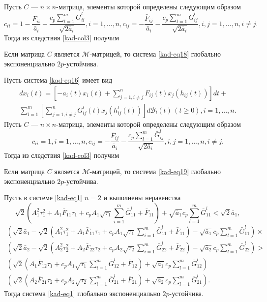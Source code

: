 Пусть $C$ --- $n\times n$-матрица, элементы которой определены
следующим образом
$$
c_{ii} = 1 - \frac{\bar F_{ii}}{\bar a_i} - \frac{c_p\sum \limits
_{l=1}^m \bar G^l_{ii}}{\sqrt{2\bar a_i}}, i = 1,...,n, c_{ij} = -
\frac{\bar F_{ij}}{\bar a_i} - \frac{c_p\sum \limits _{l=1}^m \bar
G^l_{ij}}{\sqrt{2\bar a_i}}, i,j = 1,...,n, i\neq j.
$$
Тогда из следствия \ref{kad-col3} получим
\begin{corollary}\label{kad-col5}
Если матрица $C$ является $\mathcal{M}$-матрицей, то система \eqref{kad-eq18} глобально экспоненциально $2p$-устойчива.
\end{corollary}
Пусть система \eqref{kad-eq16}  имеет вид
\begin{equation}\label{kad-eq19}
\begin{array}{crl}
dx_i(t) = \left [-a_i(t)x_i(t)+ \sum
\limits_{j=1, i\neq j}^nF_{ij}(t)x_j(h_{ij}(t))\right]dt +\\
 \sum \limits_{l=1}^m \left [\sum
\limits_{j=1, i \neq j}^nG^l_{ij}(t)x_j(h^l_{ij}(t))\right
]d\mathcal B_l(t) \, (t \ge 0), i = 1,...,n.
\end{array}
\end{equation}
Пусть $C$ --- $n\times n$-матрица, элементы которой определены
следующим образом
$$
c_{ii} = 1, i = 1,...,n, c_{ij} = - \frac{\bar F_{ij}}{\bar a_i} -
\frac{c_p\sum \limits _{l=1}^m \bar G^l_{ij}}{\sqrt{2\bar a_i}}, i,j
= 1,...,n, i\neq j.
$$
Тогда из следствия \ref{kad-col3} получим
\begin{corollary}\label{kad-col6}
Если матрица $C$ является $\mathcal{M}$-матрицей, то система \eqref{kad-eq19} глобально экспоненциально $2p$-устойчива.
\end{corollary}
\begin{corollary}\label{kad-col7}
Пусть в системе \eqref{kad-eq1} $n = 2$ и выполнены
неравенства
$$
\sqrt{2}(A_1^2\tau _1^2 + A_1\bar F_{11}\tau _1  + c_p A_1
\sqrt{\tau _1}\sum \limits _{i=1}^m\bar G^l_{11} + \bar F_{11}) +
\sqrt{\bar a_1}c_p\sum \limits _{l=1}^m \bar G^l_{11} < \sqrt{2}\bar
a_1,
$$
$$
\begin{array}{crl}
(\sqrt{2}\bar a_1 - \sqrt{2}(A_1^2\tau _1^2 + A_1\bar F_{11}\tau _1
+ c_p A_1 \sqrt{\tau _1}\sum \limits _{i=1}^m\bar G^l_{11} + \bar
F_{11}) - \sqrt{\bar a_1}c_p\sum \limits _{l=1}^m \bar G^l_{11}) \times  \\
(\sqrt{2}\bar a_2 - \sqrt{2}(A_2^2\tau _2^2 + A_2\bar F_{22}\tau _2
+ c_p A_2 \sqrt{\tau _2}\sum \limits _{i=1}^m\bar G^l_{22} + \bar
F_{22}) - \sqrt{\bar a_2}c_p\sum \limits _{l=1}^m \bar G^l_{22}) >
\\
(\sqrt{2}(A_1\bar F_{12}\tau _1 + c_p A_1 \sqrt{\tau _1}\sum \limits
_{i=1}^m\bar G^l_{12} + \bar F_{12}) + \sqrt{\bar a_1}c_p\sum
\limits _{l=1}^m \bar G^l_{12})\\
(\sqrt{2}(A_2\bar F_{21}\tau _2 + c_p A_2 \sqrt{\tau _2}\sum \limits
_{i=1}^m\bar G^l_{21} + \bar F_{21}) + \sqrt{\bar a_2} c_p\sum
\limits _{l=1}^m \bar G^l_{21}).
\end{array}
$$
Тогда система \eqref{kad-eq1} глобально экспоненциально $2p$-устойчива.
\end{corollary}
